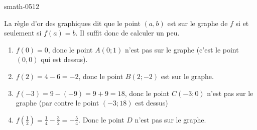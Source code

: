 
\begin{corrige}{smath-0512}

    La règle d'or des graphiques dit que le point \( (a,b)\) est sur le graphe de \( f\) si et seulement si \( f(a)=b\). Il suffit donc de calculer un peu.
    \begin{enumerate}
        \item
            \( f(0)=0\), donc le point \( A(0;1)\) n'est pas sur le graphe (c'est le point \( (0,0)\) qui est dessus).
        \item
            \( f(2)=4-6=-2\), donc le point \( B(2;-2)\) est sur le graphe.
        \item
            \( f(-3)=9-(-9)=9+9=18\), donc le point \( C(-3;0)\) n'est pas sur le graphe (par contre le point \( (-3;18)\) est dessus)
        \item
            \( f(\frac{ 1 }{2})=\frac{1}{ 4 }-\frac{ 3 }{ 2 }=-\frac{ 5 }{ 4 }\). Donc le point \( D\) n'est pas sur le graphe.
    \end{enumerate}


\end{corrige}

